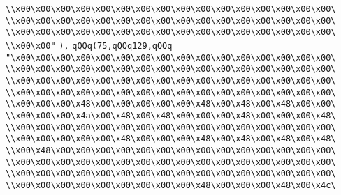 \verb|\\x00\x00\x00\x00\x00\x00\x00\x00\x00\x00\x00\x00\x00\x00\x00\x00\|\newline
\verb|\\x00\x00\x00\x00\x00\x00\x00\x00\x00\x00\x00\x00\x00\x00\x00\x00\|\newline
\verb|\\x00\x00\x00\x00\x00\x00\x00\x00\x00\x00\x00\x00\x00\x00\x00\x00\|\newline
\verb|\\x00\x00"|\newline
\verb|),|\newline
\verb|qQQq(75,qQQq129,qQQq|\newline
\verb|"\x00\x00\x00\x00\x00\x00\x00\x00\x00\x00\x00\x00\x00\x00\x00\x00\|\newline
\verb|\\x00\x00\x00\x00\x00\x00\x00\x00\x00\x00\x00\x00\x00\x00\x00\x00\|\newline
\verb|\\x00\x00\x00\x00\x00\x00\x00\x00\x00\x00\x00\x00\x00\x00\x00\x00\|\newline
\verb|\\x00\x00\x00\x00\x00\x00\x00\x00\x00\x00\x00\x00\x00\x00\x00\x00\|\newline
\verb|\\x00\x00\x00\x48\x00\x00\x00\x00\x00\x48\x00\x48\x00\x48\x00\x00\|\newline
\verb|\\x00\x00\x00\x4a\x00\x48\x00\x48\x00\x00\x00\x48\x00\x00\x00\x48\|\newline
\verb|\\x00\x00\x00\x00\x00\x00\x00\x00\x00\x00\x00\x00\x00\x00\x00\x00\|\newline
\verb|\\x00\x00\x00\x00\x00\x48\x00\x00\x00\x48\x00\x48\x00\x48\x00\x48\|\newline
\verb|\\x00\x48\x00\x00\x00\x00\x00\x00\x00\x00\x00\x00\x00\x00\x00\x00\|\newline
\verb|\\x00\x00\x00\x00\x00\x00\x00\x00\x00\x00\x00\x00\x00\x00\x00\x00\|\newline
\verb|\\x00\x00\x00\x00\x00\x00\x00\x00\x00\x00\x00\x00\x00\x00\x00\x00\|\newline
\verb|\\x00\x00\x00\x00\x00\x00\x00\x00\x00\x48\x00\x00\x00\x48\x00\x4c\|\newline

